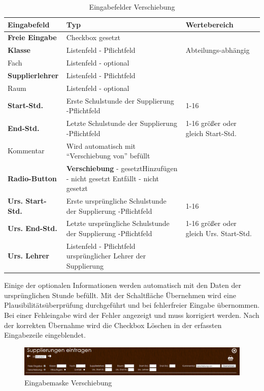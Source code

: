 \begin{table}[H]
\centering
\begin{tabular}{p{3 cm}p{6 cm}p{5 cm}}
   \toprule
   \textbf{Eingabefeld} & \textbf{Typ} & \textbf{Wertebereich} \\
   \midrule
          \textbf{Freie Eingabe} & Checkbox \newline gesetzt & \\
          \hline
          \textbf{Klasse} & Listenfeld - Pflichtfeld & Abteilungs-abhängig \\
          \hline
          Fach & Listenfeld - optional & \\
          \hline
          \textbf{Supplierlehrer} & Listenfeld - Pflichtfeld & \\
          \hline
          Raum & Listenfeld - optional & \\
          \hline
          \textbf{Start-Std.} & Erste Schulstunde der Supplierung  -Pflichtfeld & 1-16 \\
		  \hline
          \textbf{End-Std.} & Letzte Schulstunde der Supplierung  -Pflichtfeld & 1-16 \newline größer oder gleich Start-Std.\\
          \hline
          Kommentar & Wird automatisch mit \enquote{Verschiebung von} befüllt & \\
          \hline
          \textbf{Radio-Button} & \textbf{Verschiebung} - gesetzt\newline Hinzufügen - nicht gesetzt \newline Entfällt - nicht gesetzt & \\
          \hline
          \textbf{Urs. Start-Std.} & Erste ursprüngliche Schulstunde der Supplierung  -Pflichtfeld & 1-16 \\
          \hline
          \textbf{Urs. End-Std.} & Letzte ursprüngliche Schulstunde der Supplierung  -Pflichtfeld & 1-16 \newline größer oder gleich Urs. Start-Std.\\
          \hline
          \textbf{Urs. Lehrer} & Listenfeld - Pflichtfeld \newline ursprünglicher Lehrer der Supplierung\\
   \bottomrule
\end{tabular}
\caption{Eingabefelder Verschiebung}
\end{table}
Einige der optionalen Informationen werden automatisch mit den Daten der ursprünglichen Stunde befüllt.
Mit der Schaltfläche Übernehmen wird eine Plausibilitätsüberprüfung durchgeführt und bei fehlerfreier Eingabe übernommen. Bei einer Fehleingabe wird der Fehler angezeigt und muss korrigiert werden. Nach der korrekten Übernahme wird die Checkbox Löschen in der erfassten Eingabezeile eingeblendet.
\begin{figure}[H]
\centering
\includegraphics[keepaspectratio=true, width=17cm]{images/screenshots/substitudes_move.png}
\caption{Eingabemaske Verschiebung}
\label{fig:instr_substitudes_subMove}
\end{figure}
